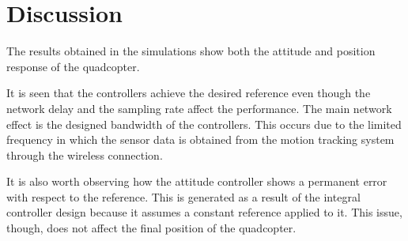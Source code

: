 \section{Discussion}\label{sec:discussion}
The results obtained in the simulations show both the attitude and position response of the quadcopter. 

It is seen that the controllers achieve the desired reference even though the network delay and the sampling rate affect the performance. The main network effect is the designed bandwidth of the controllers. This occurs due to the limited frequency in which the sensor data is obtained from the motion tracking system through the wireless connection. 

It is also worth observing how the attitude controller shows a permanent error with respect to the reference. This is generated as a result of the integral controller design because it assumes a constant reference applied to it. This issue, though, does not affect the final position of the quadcopter.